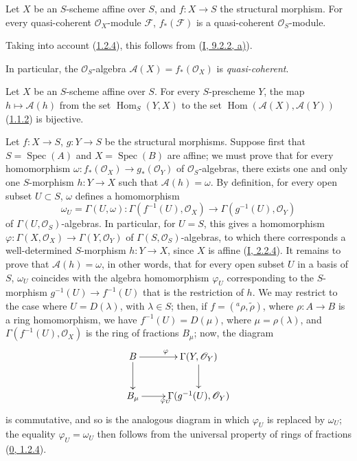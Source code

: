 \begin{proposition}[1.2.6]
\label{II.1.2.6}
Let $X$ be an $S$-scheme affine over $S$, and $f:X\to S$ the structural
morphism. For every quasi-coherent $\mathcal{O}_X$-module $\mathcal{F}$,
$f_*(\mathcal{F})$ is a quasi-coherent $\mathcal{O}_S$-module.
\end{proposition}

Taking into account (\hyperref[II.1.2.4]{1.2.4}), this follows from
(\hyperref[I.9.2.2]{I, 9.2.2, a)}).

In particular, the $\mathcal{O}_S$-algebra
$\mathcal{A}(X)=f_*(\mathcal{O}_X)$ is \emph{quasi-coherent}.

\begin{proposition}[1.2.7]
\label{II.1.2.7}
Let $X$ be an $S$-scheme affine over $S$. For every $S$-prescheme
$Y$, the map $h\mapsto\mathcal{A}(h)$ from the set
$\operatorname{Hom}_S(Y,X)$ to the set
$\operatorname{Hom}(\mathcal{A}(X),\mathcal{A}(Y))$
(\hyperref[II.1.1.2]{1.1.2}) is bijective.
\end{proposition}

Let $f:X\to S$, $g:Y\to S$ be the structural morphisms. Suppose first that
$S=\operatorname{Spec}(A)$ and $X=\operatorname{Spec}(B)$ are affine; we
must prove that for every homomorphism
$\omega:f_*(\mathcal{O}_X)\to g_*(\mathcal{O}_Y)$ of
$\mathcal{O}_S$-algebras, there exists one and only one $S$-morphism
$h:Y\to X$ such that $\mathcal{A}(h)=\omega$. By definition, for every open
subset $U\subset
S$, $\omega$ defines a homomorphism
\[
  \omega_U=\Gamma(U,\omega):
  \Gamma(f^{-1}(U),\mathcal{O}_X)\to
  \Gamma(g^{-1}(U),\mathcal{O}_Y)
\]
of $\Gamma(U,\mathcal{O}_S)$-algebras. In particular, for $U=S$, this
gives a homomorphism
$\varphi:\Gamma(X,\mathcal{O}_X)\to\Gamma(Y,\mathcal{O}_Y)$ of
$\Gamma(S,\mathcal{O}_S)$-algebras, to which there corresponds a
well-determined $S$-morphism $h:Y\to X$, since $X$ is affine
(\hyperref[I.2.2.4]{I, 2.2.4}). It remains to prove that
$\mathcal{A}(h)=\omega$, in other words, that for every open subset $U$ in a
basis of $S$, $\omega_U$ coincides with the algebra homomorphism $\varphi_U$
corresponding to the $S$-morphism $g^{-1}(U)\to f^{-1}(U)$ that is the
restriction of $h$.
We may restrict to the case where $U=D(\lambda)$, with $\lambda\in S$; then,
if $f=({}^a\rho,\widetilde{\rho})$, where $\rho:A\to B$ is a ring
homomorphism, we have $f^{-1}(U)=D(\mu)$, where $\mu=\rho(\lambda)$, and
$\Gamma(f^{-1}(U),\mathcal{O}_X)$ is the ring of fractions $B_\mu$; now,
the diagram
\[
  \xymatrix{
    B\ar[r]^\varphi\ar[d] & \Gamma(Y,\mathcal{O}_Y)\ar[d]\\
    B_\mu\ar[r]_{\varphi_U} & \Gamma(g^{-1}(U),\mathcal{O}_Y)
  }
\]
is commutative, and so is the analogous diagram in which $\varphi_U$
is replaced by $\omega_U$; the equality $\varphi_U=\omega_U$ then follows
from the universal property of rings of fractions
(\hyperref[0.1.2.4]{0, 1.2.4}).

